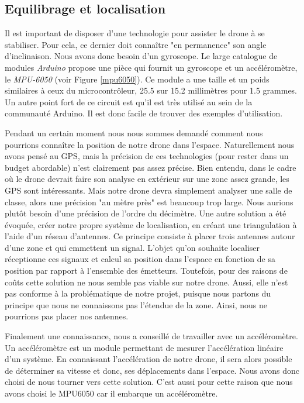 \documentclass[a4paper,10pt]{report}
\begin{document}
      \subsection{Equilibrage et localisation}
	Il est important de disposer d'une technologie pour assister le drone à 
se stabiliser. Pour cela, ce dernier doit connaître "en permanence" son angle 
d'inclinaison. Nous avons donc besoin d'un gyroscope. Le large catalogue de 
modules \textit{Arduino} propose une pièce qui fournit un gyroscope et un 
accéléromètre, le \textit{MPU-6050} (voir Figure \ref{mpu6050}). Ce module a 
une taille et un poids similaires à ceux du microcontrôleur, 25.5 sur 15.2 
millimètres pour 1.5 grammes. Un autre point fort de ce circuit est qu'il est 
très utilisé au sein de la communauté Arduino. Il est donc facile de trouver 
des exemples d'utilisation.
	
	Pendant un certain moment nous nous sommes demandé comment nous 
pourrions connaître la position de notre drone dans l'espace. Naturellement 
nous avons pensé au GPS, mais la précision de ces technologies (pour rester dans 
un budget abordable) n'est clairement pas assez précise. Bien entendu, dans le 
cadre où le drone devrait faire son analyse en extérieur sur une zone assez 
grande, les GPS sont intéressants. Mais notre drone devra simplement analyser 
une salle de classe, alors une précision "au mètre près" est beaucoup trop 
large. Nous aurions plutôt besoin d'une précision de l’ordre du décimètre.  Une 
autre solution a été évoquée, créer notre propre système de localisation, en 
créant une triangulation\cite{triangulation} à l’aide d’un réseau d’antennes. 
Ce principe consiste à placer trois antennes autour d'une zone et qui emmettent 
un signal. L'objet qu'on souhaite localiser réceptionne ces signaux et calcul 
sa position dans l'espace en fonction de sa position par rapport à l'ensemble 
des émetteurs. Toutefois, pour des raisons de coûts cette solution ne nous 
semble pas viable sur notre drone. Aussi, elle n'est pas conforme à la 
problématique de notre projet, puisque nous partons du principe que nous ne 
connaissons pas l'étendue de la zone. Ainsi, nous ne pourrions pas placer nos 
antennes.

	Finalement une connaissance, nous a conseillé de travailler avec un 
accéléromètre. Un accéléromètre est un module permettant de mesurer 
l'accélération linéaire d’un système. En connaissant l'accélération de notre 
drone, il sera alors possible de déterminer sa vitesse et donc, ses déplacements 
dans l’espace. Nous avons donc choisi de nous tourner vers cette solution. 
C'est aussi pour cette raison que nous avons choisi le MPU6050 car il embarque 
un accéléromètre.
	
\end{document}
